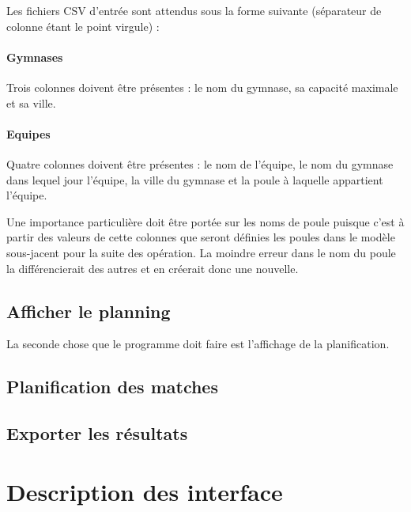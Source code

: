 \documentclass[final, noposter]{polytech/polytech}
\begin{document}
			Les fichiers CSV d'entrée sont attendus sous la forme suivante (séparateur de colonne étant le point virgule) :

			\paragraph{Gymnases}
				Trois colonnes doivent être présentes : le nom du gymnase, sa capacité maximale et sa ville.
				

			\paragraph{Equipes}
				Quatre colonnes doivent être présentes : le nom de l'équipe, le nom du gymnase dans lequel jour l'équipe, la ville du gymnase et la poule à laquelle appartient l'équipe.
				

				Une importance particulière doit être portée sur les noms de poule puisque c'est à partir des valeurs de cette colonnes que seront définies les poules dans le modèle sous-jacent pour la suite des opération. La moindre erreur dans le nom du poule la différencierait des autres et en créerait donc une nouvelle.

		\subsection{Afficher le planning}
			La seconde chose que le programme doit faire est l'affichage de la planification.

		\subsection{Planification des matches}

		\subsection{Exporter les résultats}

	\section{Description des interface}
		\label{sec:ui-design}
	
\end{document}
